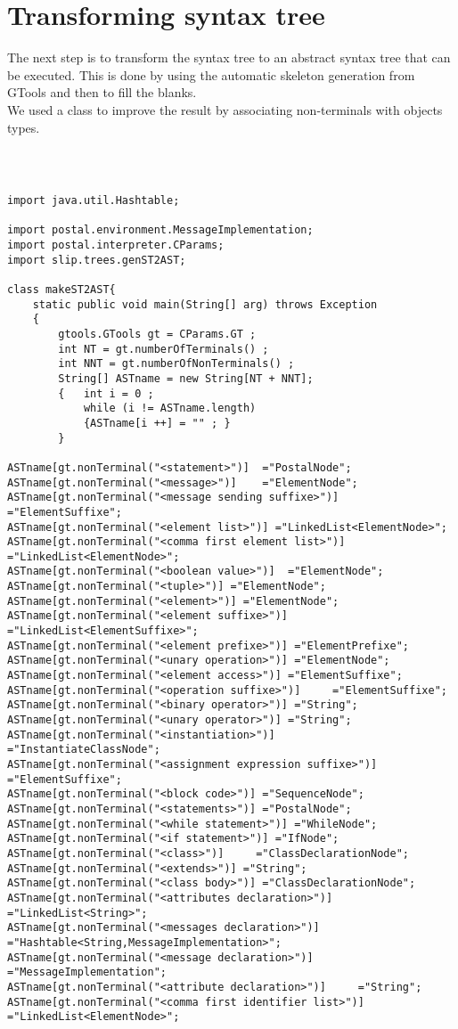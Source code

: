 \documentclass{eplDoc}
\begin{document}
\section{Transforming syntax tree}
The next step is to transform the syntax tree to an abstract syntax tree that can be executed.
This is done by using the automatic skeleton generation from GTools and then to fill the blanks.\\
We used a class to improve the result by associating non-terminals with objects types.
\begin{lstlisting}
    


import java.util.Hashtable;

import postal.environment.MessageImplementation;
import postal.interpreter.CParams;
import slip.trees.genST2AST;

class makeST2AST{
	static public void main(String[] arg) throws Exception
	{
		gtools.GTools gt = CParams.GT ;
		int NT = gt.numberOfTerminals() ;
		int NNT = gt.numberOfNonTerminals() ;
		String[] ASTname = new String[NT + NNT];
		{	int i = 0 ;
			while (i != ASTname.length)
			{ASTname[i ++] = "" ; }	
		}
		
ASTname[gt.nonTerminal("<statement>")]	="PostalNode";
ASTname[gt.nonTerminal("<message>")] 	="ElementNode";
ASTname[gt.nonTerminal("<message sending suffixe>")] ="ElementSuffixe";
ASTname[gt.nonTerminal("<element list>")] ="LinkedList<ElementNode>";
ASTname[gt.nonTerminal("<comma first element list>")] ="LinkedList<ElementNode>";
ASTname[gt.nonTerminal("<boolean value>")] 	="ElementNode";
ASTname[gt.nonTerminal("<tuple>")] ="ElementNode";
ASTname[gt.nonTerminal("<element>")] ="ElementNode";
ASTname[gt.nonTerminal("<element suffixe>")] ="LinkedList<ElementSuffixe>";  
ASTname[gt.nonTerminal("<element prefixe>")] ="ElementPrefixe";
ASTname[gt.nonTerminal("<unary operation>")] ="ElementNode";
ASTname[gt.nonTerminal("<element access>")] ="ElementSuffixe";
ASTname[gt.nonTerminal("<operation suffixe>")]     ="ElementSuffixe";
ASTname[gt.nonTerminal("<binary operator>")] ="String";
ASTname[gt.nonTerminal("<unary operator>")] ="String";
ASTname[gt.nonTerminal("<instantiation>")]     ="InstantiateClassNode";
ASTname[gt.nonTerminal("<assignment expression suffixe>")]  ="ElementSuffixe";
ASTname[gt.nonTerminal("<block code>")] ="SequenceNode";
ASTname[gt.nonTerminal("<statements>")] ="PostalNode";
ASTname[gt.nonTerminal("<while statement>")] ="WhileNode";
ASTname[gt.nonTerminal("<if statement>")] ="IfNode";
ASTname[gt.nonTerminal("<class>")]     ="ClassDeclarationNode";
ASTname[gt.nonTerminal("<extends>")] ="String";
ASTname[gt.nonTerminal("<class body>")] ="ClassDeclarationNode";
ASTname[gt.nonTerminal("<attributes declaration>")] ="LinkedList<String>";
ASTname[gt.nonTerminal("<messages declaration>")] ="Hashtable<String,MessageImplementation>";
ASTname[gt.nonTerminal("<message declaration>")] ="MessageImplementation";
ASTname[gt.nonTerminal("<attribute declaration>")]     ="String";
ASTname[gt.nonTerminal("<comma first identifier list>")] ="LinkedList<ElementNode>";


\end{lstlisting}
\end{document}
